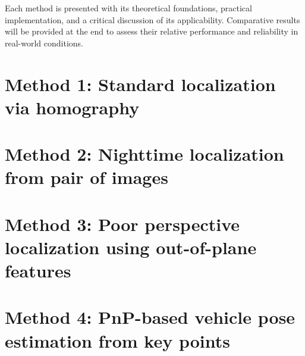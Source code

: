 Each method is presented with its theoretical foundations, practical implementation, and a critical discussion of its applicability. Comparative results will be provided at the end to assess their relative performance and reliability in real-world conditions.

\section{Method 1: Standard localization via homography}


\section{Method 2: Nighttime localization from pair of images}


\section{Method 3: Poor perspective localization using out-of-plane features}


\section{Method 4: PnP-based vehicle pose estimation from key points}

